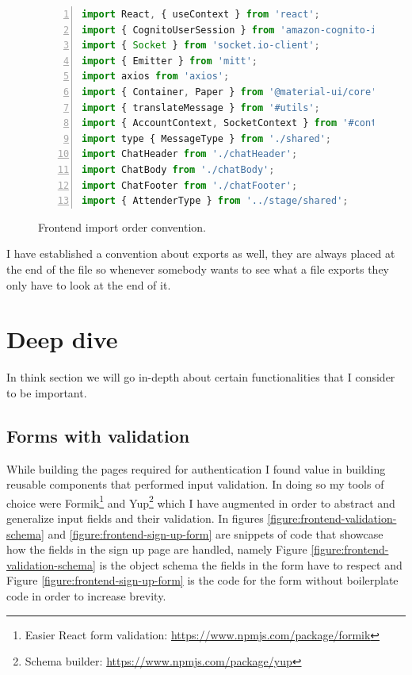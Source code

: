 \begin{figure}[H]
\begin{lstlisting}[numbers=left,language=JavaScript]
import React, { useContext } from 'react';
import { CognitoUserSession } from 'amazon-cognito-identity-js';
import { Socket } from 'socket.io-client';
import { Emitter } from 'mitt';
import axios from 'axios';
import { Container, Paper } from '@material-ui/core';
import { translateMessage } from '#utils';
import { AccountContext, SocketContext } from '#contexts';
import type { MessageType } from './shared';
import ChatHeader from './chatHeader';
import ChatBody from './chatBody';
import ChatFooter from './chatFooter';
import { AttenderType } from '../stage/shared';
\end{lstlisting}
\caption{Frontend import order convention.}
\label{figure:frontend-import-order}
\end{figure}

I have established a convention about exports as well, they are always placed at the end of the file so whenever somebody wants to see what a file exports they only have to look at the end of it.

\section{Deep dive}

In think section we will go in-depth about certain functionalities that I consider to be important.

\subsection{Forms with validation}

While building the pages required for authentication I found value in building reusable components that performed input validation. In doing so my tools of choice were Formik\footnote{Easier React form validation: \href{https://www.npmjs.com/package/formik}{https://www.npmjs.com/package/formik}} and Yup\footnote{Schema builder: \href{https://www.npmjs.com/package/yup}{https://www.npmjs.com/package/yup}} which I have augmented in order to abstract and generalize input fields and their validation. In figures \ref{figure:frontend-validation-schema} and \ref{figure:frontend-sign-up-form} are snippets of code that showcase how the fields in the sign up page are handled, namely Figure \ref{figure:frontend-validation-schema} is the object schema the fields in the form have to respect and Figure \ref{figure:frontend-sign-up-form} is the code for the form without boilerplate code in order to increase brevity.

